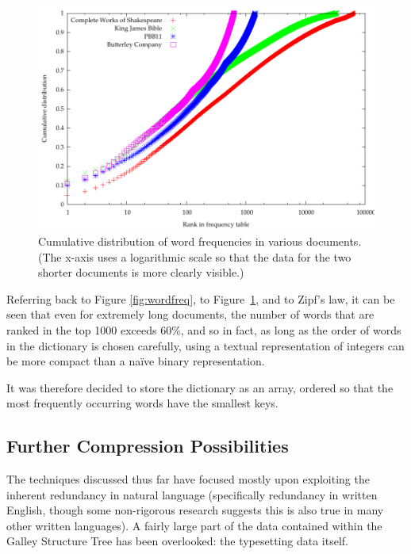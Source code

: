 \begin{figure}
  \begin{center}
  \includegraphics[width=\textwidth]{gnuplot/cumulative}
  \end{center}
  \caption[Cumulative distribution of word frequencies]{Cumulative distribution of word frequencies in various documents. (The x-axis uses a logarithmic scale so that the data for the two shorter documents is more clearly visible.)}
  \label{fig:cumulative}
\end{figure}

Referring back to Figure \ref{fig:wordfreq}, to Figure~\ref{fig:cumulative}, and to Zipf's law, it can be seen that even for extremely long documents, the number of words that are ranked in the top 1000 exceeds 60\%, and so in fact, as long as the order of words in the dictionary is chosen carefully, using a textual representation of integers can be more compact than a na\"ive binary representation.

It was therefore decided to store the dictionary as an array, ordered so that the most frequently occurring words have the smallest keys.

\subsection{Further Compression Possibilities}
\label{sec:deltas}

The techniques discussed thus far have focused mostly upon exploiting the inherent redundancy in natural language (specifically redundancy in written English, though some non-rigorous research suggests this is also true in many other written languages). A fairly large part of the data contained within the Galley Structure Tree has been overlooked: the typesetting data itself.

